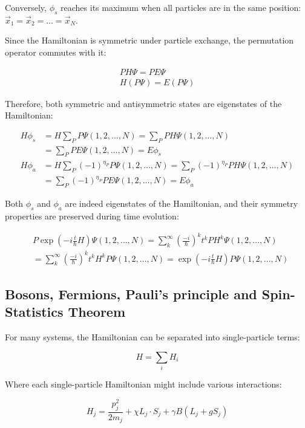 \documentclass[italian]{HKNdocument}
\begin{document}
Conversely, $\phi_s$ reaches its maximum when all particles are in the same position: $\vec{x}_1=\vec{x}_2=\ldots=\vec{x}_N$.

Since the Hamiltonian is symmetric under particle exchange, the permutation operator commutes with it:

\begin{gather}
PH\Psi=PE\Psi\\
H(P\Psi)=E(P\Psi) \label{eq:14.14}
\end{gather}

Therefore, both symmetric and antisymmetric states are eigenstates of the Hamiltonian:

\begin{align}
H\phi_s&=H\sum_P P\Psi(1,2,\ldots,N)=\sum_P PH\Psi(1,2,\ldots,N)\\
&=\sum_P PE\Psi(1,2,\ldots,N)=E\phi_s \label{eq:14.15}\\
H\phi_a&=H\sum_P(-1)^{\eta_P}P\Psi(1,2,\ldots,N)=\sum_P(-1)^{\eta_P}PH\Psi(1,2,\ldots,N)\\
&=\sum_P(-1)^{\eta_P}PE\Psi(1,2,\ldots,N)=E\phi_a \label{eq:14.16}
\end{align}


Both $\phi_s$ and $\phi_a$ are indeed eigenstates of the Hamiltonian, and their symmetry properties are preserved during time evolution:

\begin{align}
&P\exp(-i\frac{t}{\hbar}H)\Psi(1,2,\ldots,N)=\sum_{k}^{\infty}(\frac{-i}{\hbar})^k t^k PH^k\Psi(1,2,\ldots,N)\\
&=\sum_{k}^{\infty}(\frac{-i}{\hbar})^k t^k H^kP\Psi(1,2,\ldots,N)=\exp(-i\frac{t}{\hbar}H)P\Psi(1,2,\ldots,N) \label{eq:14.17}
\end{align}

\subsection{Bosons, Fermions, Pauli's principle and Spin-Statistics Theorem}
For many systems, the Hamiltonian can be separated into single-particle terms:

\begin{equation}
H=\sum_i H_i \label{eq:14.18}
\end{equation}

Where each single-particle Hamiltonian might include various interactions:

\begin{equation}
H_j=\frac{p_j^2}{2m_j}+\chi L_j\cdot S_j+\gamma B(L_j+gS_j) \label{eq:14.19}
\end{equation}
\end{document}
